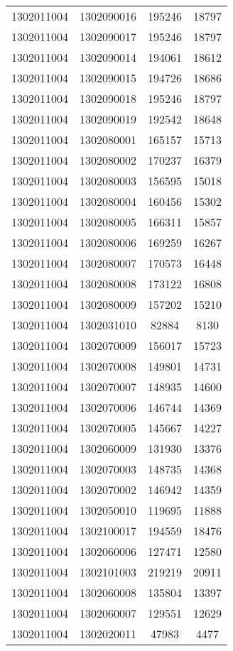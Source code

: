 \begin{longtable}[h]{llcc}
		1302011004 & 1302090016 & 195246 & 18797\\
		1302011004 & 1302090017 & 195246 & 18797\\
		1302011004 & 1302090014 & 194061 & 18612\\
		1302011004 & 1302090015 & 194726 & 18686\\
		1302011004 & 1302090018 & 195246 & 18797\\
		1302011004 & 1302090019 & 192542 & 18648\\
		1302011004 & 1302080001 & 165157 & 15713\\
		1302011004 & 1302080002 & 170237 & 16379\\
		1302011004 & 1302080003 & 156595 & 15018\\
		1302011004 & 1302080004 & 160456 & 15302\\
		1302011004 & 1302080005 & 166311 & 15857\\
		1302011004 & 1302080006 & 169259 & 16267\\
		1302011004 & 1302080007 & 170573 & 16448\\
		1302011004 & 1302080008 & 173122 & 16808\\
		1302011004 & 1302080009 & 157202 & 15210\\
		1302011004 & 1302031010 & 82884 & 8130\\
		1302011004 & 1302070009 & 156017 & 15723\\
		1302011004 & 1302070008 & 149801 & 14731\\
		1302011004 & 1302070007 & 148935 & 14600\\
		1302011004 & 1302070006 & 146744 & 14369\\
		1302011004 & 1302070005 & 145667 & 14227\\
		1302011004 & 1302060009 & 131930 & 13376\\
		1302011004 & 1302070003 & 148735 & 14368\\
		1302011004 & 1302070002 & 146942 & 14359\\
		1302011004 & 1302050010 & 119695 & 11888\\
		1302011004 & 1302100017 & 194559 & 18476\\
		1302011004 & 1302060006 & 127471 & 12580\\
		1302011004 & 1302101003 & 219219 & 20911\\
		1302011004 & 1302060008 & 135804 & 13397\\
		1302011004 & 1302060007 & 129551 & 12629\\
		1302011004 & 1302020011 & 47983 & 4477\\

\end{longtable}

